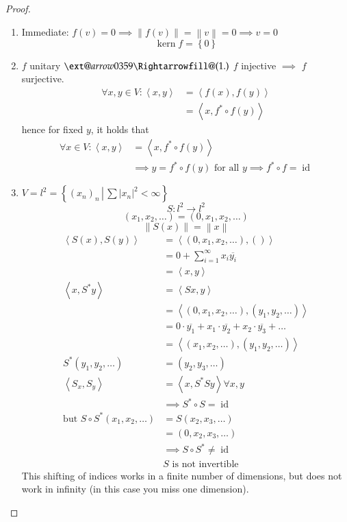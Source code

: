 \documentclass{article}
\makeatletter
\newcommand{\set}[1]{\left\{#1\right\}}
\newcommand{\setdef}[2]{\left\{\left.#1\,\right|\,#2\right\}}
\newcommand{\ip}[2]{\left\langle#1,#2\right\rangle} %
\newcommand{\norm}[1]{\left\|#1\right\|}
\newcommand{\card}[1]{\left|#1\right|}
\newcommand{\xRightarrow}[2][]{\ext@arrow 0359\Rightarrowfill@{#1}{#2}}
\DeclareMathOperator{\ke}{kern}
\makeatother
\begin{document}
\begin{proof}
  \begin{enumerate}
    \item Immediate: $f(v) = 0 \implies \norm{f(v)} = \norm{v} = 0 \implies v = 0$
      \[ \ke{f} = \set{0} \]
    \item $f$ unitary $\xRightarrow{(1.)}$ $f$ injective $\implies$ $f$ surjective.
      \begin{align*}
        \forall x,y \in V: \ip xy &= \ip{f(x)}{f(y)} \\
          &= \ip{x}{f^* \circ f(y)}
      \end{align*}
      hence for fixed $y$, it holds that
      \begin{align*}
        \forall x \in V: \ip{x}{y} &= \ip{x}{f^* \circ f(y)} \\
          & \implies y = f^* \circ f(y) \text{ for all } y \implies f^* \circ f = \operatorname{id}
      \end{align*}
    \item $V = l^2 = \setdef{(x_n)_n}{\sum \card{x_n}^2 < \infty}$
      \[ S: l^2 \to l^2 \]
      \[ (x_1, x_2, \dots) = (0, x_1, x_2, \dots) \]
      \[ \norm{S(x)} = \norm{x} \]
      \begin{align*}
        \ip{S(x)}{S(y)} &= \ip{(0, x_1, x_2, \ldots)}{()} \\
          &= 0 + \sum_{i=1}^\infty x_i \overline{y_i} \\
          &= \ip xy \\
        \ip{x}{S^*y} &= \ip{Sx}{y} \\
          &= \ip{(0, x_1, x_2, \dots)}{(y_1, y_2, \dots)} \\
          &= 0 \cdot \overline{y_1} + x_1 \cdot \overline{y_2} + x_2 \cdot \overline{y_3} + \dots \\
          &= \ip{(x_1, x_2, \dots)}{(y_1, y_2, \dots)} \\
        S^*(y_1, y_2, \dots) &= (y_2, y_3, \dots) \\
        \ip{S_x}{S_y} &= \ip{x}{S^*Sy} \forall x,y \\
          &\implies S^* \circ S = \operatorname{id} \\
        \text{but } S \circ S^*(x_1, x_2, \dots)
          &= S(x_2, x_3, \dots) \\
          &= (0, x_2, x_3, \dots) \\
          &\implies S \circ S^* \neq \operatorname{id} \\
          & S \text{ is not invertible}
      \end{align*}
      This shifting of indices works in a finite number of dimensions, but does not work in infinity (in this case you miss one dimension).
  \end{enumerate}
\end{proof}
\end{document}
